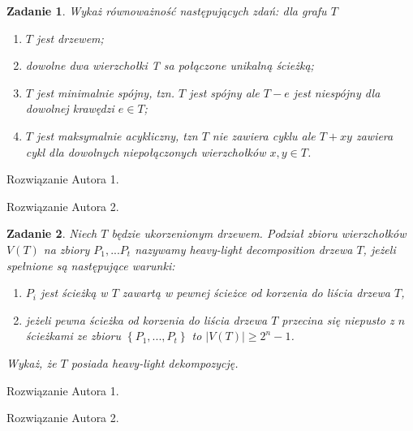 \documentclass{mwart}
\newtheorem{zad}{Zadanie}[section]
\begin{document}
\begin{zad}
    Wykaż równoważność następujących zdań: dla grafu $T$
    \begin{enumerate}
        \item $T$ jest drzewem;
        \item dowolne dwa wierzchołki T sa połączone unikalną ścieżką;
        \item $T$ jest minimalnie spójny, tzn. $T$ jest spójny ale $T - e$ jest niespójny dla dowolnej krawędzi $e \in T$;
        \item $T$ jest maksymalnie acykliczny, tzn $T$ nie zawiera cyklu ale $T+ xy$ zawiera cykl dla dowolnych niepołączonych wierzchołków $x,y \in T$.
    \end{enumerate}
\end{zad}\begin{mdframed}
    Rozwiązanie Autora 1.
\end{mdframed}
\begin{mdframed}
    Rozwiązanie Autora 2.
\end{mdframed}


\begin{zad}
    Niech $T$ będzie ukorzenionym drzewem. Podział zbioru wierzchołków $V(T)$ na zbiory $P_1, ... P_t$ nazywamy
    heavy-light decomposition drzewa $T$, jeżeli spełnione są następujące warunki:
    \begin{enumerate}
        \item  $P_i$ jest ścieżką w $T$ zawartą w pewnej ścieżce od korzenia do liścia drzewa $T$,
        \item  jeżeli pewna ścieżka od korzenia do liścia drzewa $T$ przecina się niepusto z $n$ ścieżkami
              ze zbioru $\left\{P_1, ..., P_t\right\}$ to $|V(T)| \geq 2^n-1$.
    \end{enumerate}
    Wykaż, że $T$ posiada heavy-light dekompozycję.
\end{zad}
\begin{mdframed}
    Rozwiązanie Autora 1.
\end{mdframed}
\begin{mdframed}
    Rozwiązanie Autora 2.
\end{mdframed}
\end{document}

